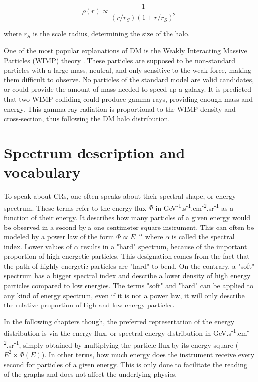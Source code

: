 \begin{equation}
\rho (r) \propto \frac{1}{\left( r/r_S \right) \left( 1 + r/r_S \right)^2 }
\end{equation}

where $r_S$ is the scale radius, determining the size of the halo. \cite{NFW1997}


One of the most popular explanations of DM is the Weakly Interacting Massive Particles (WIMP) theory \cite{Jungman1996}. These particles are supposed to be non-standard particles with a large mass, neutral, and only sensitive to the weak force, making them difficult to observe. No particles of the standard model are valid candidates, or could provide the amount of mass needed to speed up a galaxy.
It is predicted that two WIMP colliding could produce gamma-rays, providing enough mass and energy. This gamma ray radiation is proportional to the WIMP density and cross-section, thus following the DM halo distribution.

\newpage
\section{Spectrum description and vocabulary}

To speak about CRs, one often speaks about their spectral shape, or energy spectrum. These terms refer to the energy flux $\Phi$ in GeV\textsuperscript{-1}.s\textsuperscript{-1}.cm\textsuperscript{-2}.sr\textsuperscript{-1} as a function of their energy. It describes how many particles of a given energy would be observed in a second by a one centimeter square instrument. This can often be modeled by a power law of the form $\Phi \propto E^{-\alpha}$  where $\alpha$ is called the spectral index. Lower values of $\alpha$ results in a "hard" spectrum, because of the important proportion of high energetic particles. This designation comes from the fact that the path of highly energetic particles are "hard" to bend. On the contrary, a "soft" spectrum has a bigger spectral index and describe a lower density of high energy particles compared to low energies. The terms "soft" and "hard" can be applied to any kind of energy spectrum, even if it is not a power law, it will only describe the relative proportion of high and low energy particles.

In the following chapters though, the preferred representation of the energy distribution is via the energy flux, or spectral energy distribution in GeV.s\textsuperscript{-1}.cm\textsuperscript{-2}.sr\textsuperscript{-1}, simply obtained by multiplying the particle flux by its energy square ($E^2 \times \Phi(E)$). In other terms, how much energy does the instrument receive every second for particles of a given energy. This is only done to facilitate the reading of the graphs and does not affect the underlying physics.



